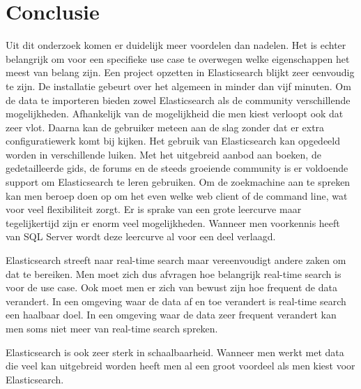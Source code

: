 
\chapter{Conclusie}
\label{ch:conclusie}


Uit dit onderzoek komen er duidelijk meer voordelen dan nadelen. Het is echter belangrijk om voor een specifieke use case te overwegen welke eigenschappen het meest van belang zijn. Een project opzetten in Elasticsearch blijkt zeer eenvoudig te zijn. De installatie gebeurt over het algemeen in minder dan vijf minuten. Om de data te importeren bieden zowel Elasticsearch als de community verschillende mogelijkheden. Afhankelijk van de mogelijkheid die men kiest verloopt ook dat zeer vlot. Daarna kan de gebruiker meteen aan de slag zonder dat er extra configuratiewerk komt bij kijken. Het gebruik van Elasticsearch kan opgedeeld worden in verschillende luiken. Met het uitgebreid aanbod aan boeken, de gedetailleerde gids, de forums en de steeds groeiende community is er voldoende support om Elasticsearch te leren gebruiken. Om de zoekmachine aan te spreken kan men beroep doen op om het even welke web client of de command line, wat voor veel flexibiliteit zorgt. Er is sprake van een grote leercurve maar tegelijkertijd zijn er enorm veel mogelijkheden. Wanneer men voorkennis heeft van SQL Server wordt deze leercurve al voor een deel verlaagd.

Elasticsearch streeft naar real-time search maar vereenvoudigt andere zaken om dat te bereiken. Men moet zich dus afvragen hoe belangrijk real-time search is voor de use case. Ook moet men er zich van bewust zijn hoe frequent de data verandert. In een omgeving waar de data af en toe verandert is real-time search een haalbaar doel. In een omgeving waar de data zeer frequent verandert kan men soms niet meer van real-time search spreken.

Elasticsearch is ook zeer sterk in schaalbaarheid. Wanneer men werkt met data die veel kan uitgebreid worden heeft men al een groot voordeel als men kiest voor Elasticsearch.

